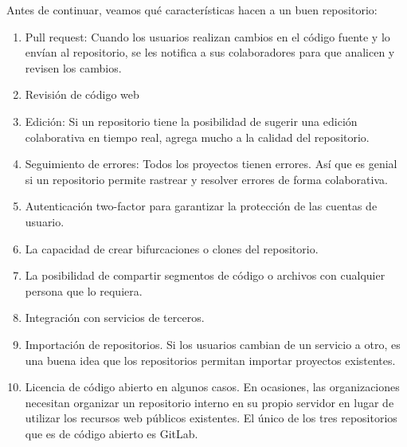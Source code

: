 \documentclass{article} %
\begin{document}
\noindent Antes de continuar, veamos qu\'{e} caracter\'{i}sticas hacen a un buen repositorio:

\begin{enumerate}
\item  Pull request: Cuando los usuarios realizan cambios en el c\'{o}digo fuente y lo env\'{i}an al repositorio, se les notifica a sus colaboradores para que analicen y revisen los cambios.

\item  Revisi\'{o}n de c\'{o}digo web

\item  Edici\'{o}n: Si un repositorio tiene la posibilidad de sugerir una edici\'{o}n colaborativa en tiempo real, agrega mucho a la calidad del repositorio.

\item  Seguimiento de errores: Todos los proyectos tienen errores. As\'{i} que es genial si un repositorio permite rastrear y resolver errores de forma colaborativa.

\item  Autenticaci\'{o}n two-factor para garantizar la protecci\'{o}n de las cuentas de usuario.

\item  La capacidad de crear bifurcaciones o clones del repositorio.

\item  La posibilidad de compartir segmentos de c\'{o}digo o archivos con cualquier persona que lo requiera.

\item  Integraci\'{o}n con servicios de terceros.

\item  Importaci\'{o}n de repositorios. Si los usuarios cambian de un servicio a otro, es una buena idea que los repositorios permitan importar proyectos existentes.

\item  Licencia de c\'{o}digo abierto en algunos casos. En ocasiones, las organizaciones necesitan organizar un repositorio interno en su propio servidor en lugar de utilizar los recursos web p\'{u}blicos existentes. El \'{u}nico de los tres repositorios que es de c\'{o}digo abierto es GitLab.
\end{enumerate}

\noindent 
\end{document}
